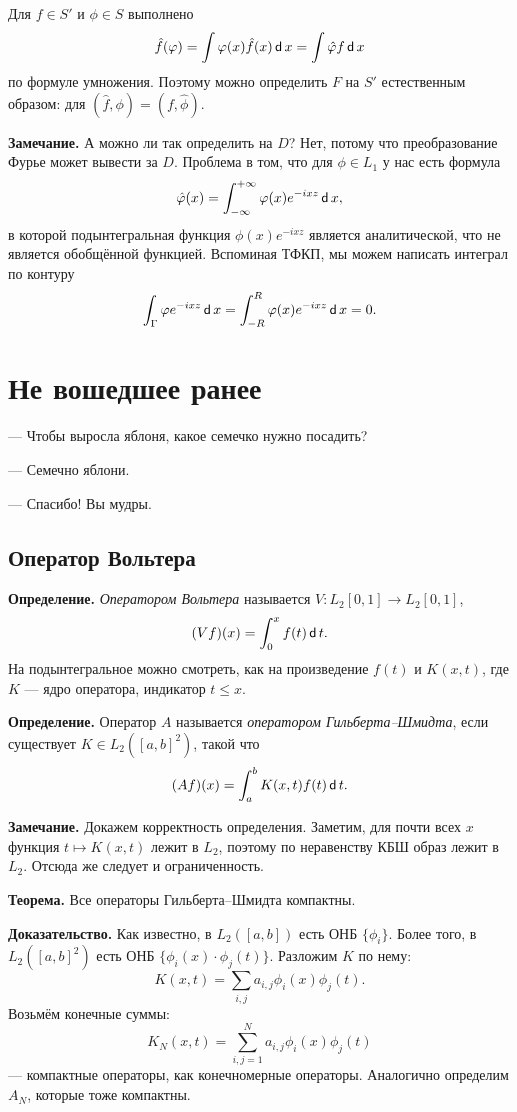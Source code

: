 Для $f \in S'$ и $\phi \in S$ выполнено
\[
    \hat f(\varphi) = \int \varphi(x) \hat f(x) \operatorname{\mathsf d} x = \int \hat {\varphi} f \operatorname{\mathsf d} x
\]
по формуле умножения.
Поэтому можно определить $F$ на $S'$ естественным образом: для $(\hat f, \phi) = (f, \hat \phi)$.

\textbf{Замечание.} А можно ли так определить на $D$?
Нет, потому что преобразование Фурье может вывести за $D$.
Проблема в том, что для $\phi \in L_1$ у нас есть формула
\[
    \hat {\varphi}(x) = \int_{-\infty}^{+\infty} \varphi(x) e^{-ixz} \operatorname{\mathsf d} x,
\]
в которой подынтегральная функция $\phi(x) e^{-ixz}$ является аналитической, что не является обобщённой функцией.
Вспоминая ТФКП, мы можем написать интеграл по контуру
\[
    \int_{\Gamma} \varphi e^{-ixz} \operatorname{\mathsf d} x = \int_{-R}^R \varphi(x) e^{-ixz} \operatorname{\mathsf d} x = 0.
\]

\section{Не вошедшее ранее}
\epigraph{
--- Чтобы выросла яблоня, какое семечко нужно посадить?

--- Семечно яблони.

--- Спасибо! Вы мудры.
}{}
\subsection{Оператор Вольтера}
\textbf{Определение.} \textit{Оператором Вольтера} называется $V: L_2[0, 1] \to L_2[0, 1]$, 
\[
    (Vf)(x) = \int_0^x f(t) \operatorname{\mathsf d} t.
\]
На подынтегральное можно смотреть, как на произведение $f(t)$ и $K(x, t)$, где $K$ --- ядро оператора, индикатор $t \le x$.

\textbf{Определение.} Оператор $A$ называется \textit{оператором Гильберта--Шмидта}, если существует $K \in L_2([a, b]^2)$, такой что
\[
    (Af)(x) = \int_a^b K(x, t) f(t) \operatorname{\mathsf d} t.
\]

\textbf{Замечание.} Докажем корректность определения.
Заметим, для почти всех $x$ функция $t \mapsto K(x, t)$ лежит в $L_2$, поэтому по неравенству КБШ образ лежит в $L_2$.
Отсюда же следует и ограниченность.

\textbf{Теорема.} Все операторы Гильберта--Шмидта компактны.

\textbf{Доказательство.} Как известно, в $L_2([a, b])$ есть ОНБ $\{\phi_i\}$.
Более того, в $L_2([a, b]^2)$ есть ОНБ $\{\phi_i(x) \cdot \phi_j(t)\}$.
Разложим $K$ по нему: 
\[
    K(x, t) = \sum_{i,j} a_{i,j} \phi_i(x) \phi_j(t).
\]
Возьмём конечные суммы:
\[
    K_N(x, t) = \sum_{i,j=1}^N a_{i,j} \phi_i(x) \phi_j(t)
\]
--- компактные операторы, как конечномерные операторы.
Аналогично определим $A_N$, которые тоже компактны.


